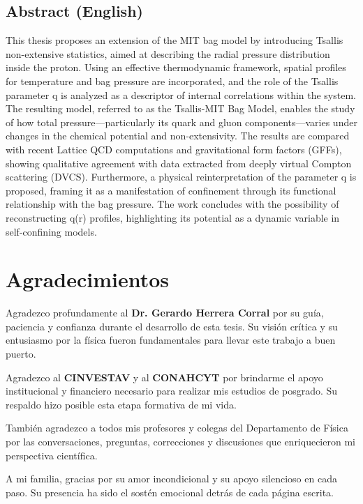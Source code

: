 \documentclass[12pt, a4paper, twoside, openright, final]{book}
\begin{document}
\section*{Abstract (English)}
This thesis proposes an extension of the MIT bag model by introducing Tsallis non-extensive statistics, aimed at describing the radial pressure distribution inside the proton. Using an effective thermodynamic framework, spatial profiles for temperature and bag pressure are incorporated, and the role of the Tsallis parameter q is analyzed as a descriptor of internal correlations within the system. The resulting model, referred to as the Tsallis-MIT Bag Model, enables the study of how total pressure—particularly its quark and gluon components—varies under changes in the chemical potential and non-extensivity. The results are compared with recent Lattice QCD computations and gravitational form factors (GFFs), showing qualitative agreement with data extracted from deeply virtual Compton scattering (DVCS). Furthermore, a physical reinterpretation of the parameter q is proposed, framing it as a manifestation of confinement through its functional relationship with the bag pressure. The work concludes with the possibility of reconstructing q(r) profiles, highlighting its potential as a dynamic variable in self-confining models.

\newpage
\thispagestyle{empty}

\chapter*{Agradecimientos}
\label{ch: Agradecimientos}

\noindent
Agradezco profundamente al \textbf{Dr. Gerardo Herrera Corral} por su guía, paciencia y confianza durante el desarrollo de esta tesis. Su visión crítica y su entusiasmo por la física fueron fundamentales para llevar este trabajo a buen puerto. 

Agradezco al \textbf{CINVESTAV} y al \textbf{CONAHCYT} por brindarme el apoyo institucional y financiero necesario para realizar mis estudios de posgrado. Su respaldo hizo posible esta etapa formativa de mi vida.

También agradezco a todos mis profesores y colegas del Departamento de Física por las conversaciones, preguntas, correcciones y discusiones que enriquecieron mi perspectiva científica.

A mi familia, gracias por su amor incondicional y su apoyo silencioso en cada paso. Su presencia ha sido el sostén emocional detrás de cada página escrita.
\end{document}
